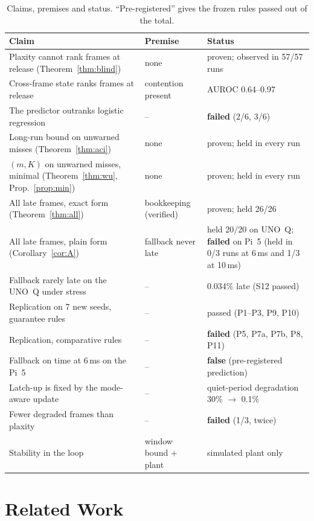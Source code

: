 \documentclass[acmsmall,screen]{acmart}
\begin{document}
\begin{table}[t]
\caption{Claims, premises and status. ``Pre-registered'' gives the frozen rules passed out of the total.}
\label{tab:claims}
\footnotesize
\begin{tabular}{@{}p{}p{}p{}@{}}
\toprule
Claim & Premise & Status \\
\midrule
Plaxity cannot rank frames at release (Theorem~\ref{thm:blind}) & none & proven; observed in 57/57 runs \\
Cross-frame state ranks frames at release & contention present & AUROC 0.64--0.97 \\
The predictor outranks logistic regression & -- & \textbf{failed} (2/6, 3/6) \\
Long-run bound on unwarned misses (Theorem~\ref{thm:aci}) & none & proven; held in every run \\
$(m,K)$ on unwarned misses, minimal (Theorem~\ref{thm:wu}, Prop.~\ref{prop:min}) & none & proven; held in every run \\
All late frames, exact form (Theorem~\ref{thm:all}) & bookkeeping (verified) & proven; held 26/26 \\
All late frames, plain form (Corollary~\ref{cor:A}) & fallback never late & held 20/20 on UNO~Q; \textbf{failed} on Pi~5 (held in 0/3 runs at 6\,ms and 1/3 at 10\,ms) \\
Fallback rarely late on the UNO~Q under stress & -- & 0.034\% late (S12 passed) \\
Replication on 7 new seeds, guarantee rules & -- & passed (P1--P3, P9, P10) \\
Replication, comparative rules & -- & \textbf{failed} (P5, P7a, P7b, P8, P11) \\
Fallback on time at 6\,ms on the Pi~5 & -- & \textbf{false} (pre-registered prediction) \\
Latch-up is fixed by the mode-aware update & -- & quiet-period degradation 30\% $\to$ 0.1\% \\
Fewer degraded frames than plaxity & -- & \textbf{failed} (1/3, twice) \\
Stability in the loop & window bound + plant & simulated plant only \\
\bottomrule
\end{tabular}
\end{table}

\section{Related Work}\label{sec:related}
\end{document}
